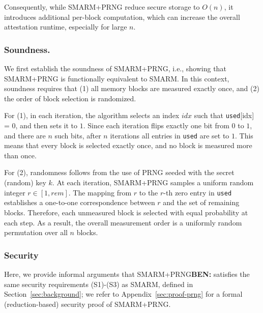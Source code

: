 \documentclass{ieeeaccess}
\DeclareRobustCommand{\ben}[1]{{\color{BENcolor}\textbf{BEN:} #1}}
\newcommand{\rtsmarmone}{SMARM+PRNG\xspace}
\begin{document}
Consequently, while \rtsmarmone reduce secure storage to $O(n)$, it introduces additional per-block computation, which can increase the overall attestation runtime, especially for large $n$.




\subsubsection{Soundness.}\label{subsubsec:v1-sound}
We first establish the soundness of \rtsmarmone, i.e., showing that \rtsmarmone is functionally equivalent to SMARM.
In this context, soundness requires that (1) all memory blocks are measured exactly once, and (2) the order of block selection is randomized.

For (1), in each iteration, the algorithm selects an index $idx$ such that \texttt{used}[idx] = 0, and then sets it to $1$.
Since each iteration flips exactly one bit from $0$ to $1$, and there are $n$ such bits, after $n$ iterations all entries in \texttt{used} are set to $1$.
This means that every block is selected exactly once, and no block is measured more than once.

For (2), randomness follows from the use of PRNG seeded with the secret (random) key $k$.
At each iteration, \rtsmarmone samples a uniform random integer $r \in [1, rem]$.
The mapping from $r$ to the $r$-th zero entry in \texttt{used} establishes a one-to-one correspondence between $r$ and the set of remaining blocks.
Therefore, each unmeasured block is selected with equal probability at each step.
As a result, the overall measurement order is a uniformly random permutation over all $n$ blocks.

\subsubsection{Security}
Here, we provide informal arguments that \rtsmarmone \ben{satisfies the same security requirements (S1)-(S3) as SMARM,} defined in Section~\ref{sec:background}; we refer to Appendix~\ref{sec:proof-prng} for a formal (reduction-based) security proof of \rtsmarmone.
\end{document}
